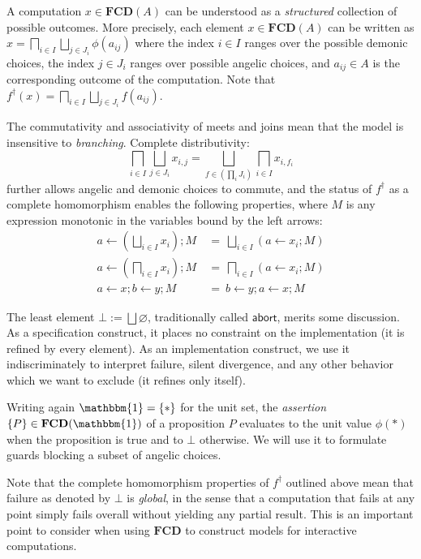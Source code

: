 \documentclass[11pt,oneside,draft]{book}
\theoremstyle{definition}
\newcommand{\kw}[1]{\ensuremath{ \mathsf{#1} }}
\begin{document}
A computation $x \in \mathbf{FCD}(A)$
can be understood as
a \emph{structured} collection of possible outcomes.
More precisely,
each element $x \in \mathbf{FCD}(A)$ can be written as
$
    x = \bigsqcap_{i \in I} \bigsqcup_{j \in J_i} \phi(a_{ij})
$
where
the index $i \in I$ ranges over the possible demonic choices,
the index $j \in J_i$ ranges over possible angelic choices,
and $a_{ij} \in A$ is the corresponding outcome of the computation.
Note that
$f^\dagger(x) = \bigsqcap_{i \in I} \bigsqcup_{j \in J_i} f(a_{ij})$.

The commutativity and associativity of meets and joins
mean that the model is insensitive to \emph{branching}.
Complete distributivity:
\[
    \bigsqcap_{i \in I} \bigsqcup_{j \in J_i} x_{i,j} =
    \bigsqcup_{f \in (\prod_i J_i)} \bigsqcap_{i \in I} x_{i, f_i}
\]
further allows angelic and demonic choices to commute,
and the status of $f^\dagger$ as a complete homomorphism
enables the following properties,
where $M$ is any expression monotonic in the variables
bound by the left arrows:
\begin{align*}
    a \leftarrow \left( \bigsqcup_{i \in I} x_i \right) \mathop{;} M \: &= \:
      \bigsqcup_{i \in I} (a \leftarrow x_i \mathop{;} M)
    \\
    a \leftarrow \left( \bigsqcap_{i \in I} x_i \right) \mathop{;} M \: &= \:
      \bigsqcap_{i \in I} (a \leftarrow x_i \mathop{;} M)
    \\
    a \leftarrow x \mathop{;} b \leftarrow y \mathop{;} M \: &= \:
    b \leftarrow y \mathop{;} a \leftarrow x \mathop{;} M
\end{align*}

The least element $\bot := \bigsqcup \varnothing$,
traditionally called $\kw{abort}$,
merits some discussion.
As a specification construct,
it places no constraint on the implementation
(it is refined by every element).
As an implementation construct,
we use it indiscriminately to interpret
failure, silent divergence,
and any other behavior
which we want to exclude (it refines only itself).

Writing again $\mathbbm{1} = \{ * \}$ for the unit set,
the \emph{assertion} $\{P\} \in \mathbf{FCD}(\mathbbm{1})$ of a proposition $P$
evaluates to the unit value $\phi(*)$ when the proposition is true
and to $\bot$ otherwise.
We will use it to formulate guards
blocking a subset of angelic choices.

Note that the complete homomorphism properties of $f^\dagger$
outlined above
mean that failure as denoted by $\bot$ is \emph{global},
in the sense that a computation that fails at any point
simply fails overall without yielding any partial result.
This is an important point to consider when using $\mathbf{FCD}$
to construct models for interactive computations.
\end{document}
